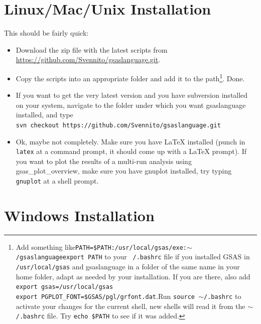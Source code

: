 \section{Linux/Mac/Unix Installation}
This should be fairly quick:
\begin{itemize}
\item Download the zip file with the latest scripts from \url{https://github.com/Svennito/gsaslanguage.git}. 
\item Copy the scripts into an appropriate folder and add it to the path\footnote{Add something like\newline \texttt{PATH=\$PATH:/usr/local/gsas/exe:$\sim$/gsaslanguage\newline export PATH\newline} to your \texttt{~/.bashrc} file if you installed GSAS in \texttt{/usr/local/gsas} and gsaslanguage in a folder of the same name in your home folder, adapt as needed by your installation. If you are there, also add \texttt{\\export gsas=/usr/local/gsas \\export PGPLOT\_FONT=\$GSAS/pgl/grfont.dat}.Run \texttt{source $\sim$/.bashrc} to activate your changes for the current shell, new shells will read it from the \texttt{$\sim$/.bashrc} file. Try \texttt{echo \$PATH} to see if it was added.}. Done.
\item If you want to get the very latest version and you have subversion
installed on your system, navigate to the folder under which you want
gsaslanguage installed, and type\\
\texttt{svn checkout https://github.com/Svennito/gsaslanguage.git}
\item Ok, maybe not completely. Make sure you have \LaTeX{}  installed (punch in \texttt{latex} at a command prompt, it should come up with a \LaTeX{}  prompt). If you want to plot the results of a multi-run analysis using gsas\_plot\_overview, make sure you have gnuplot installed, try typing \texttt{gnuplot} at a shell prompt.
\end{itemize}

\section{Windows Installation}

